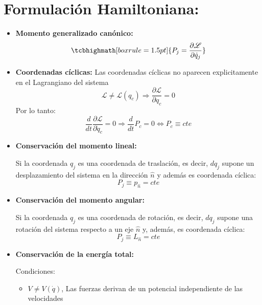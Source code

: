 \documentclass[14pt]{extarticle}
\newcommand{\Lagr}{\mathscr{L}}
\newcommand{\ddt}{\frac{d}{dt}}
\begin{document}
	\clearpage
	\section{Formulación Hamiltoniana:}

		\begin{itemize}
			\item{ \textbf{Momento generalizado canónico: }
			\begin{equation}
				\tcbhighmath[boxrule=1.5pt]{P_j = \frac{\partial \Lagr}{\partial \dot{q}_j}}
			\end{equation}
			}

			\item{ \textbf{Coordenadas cíclicas: }
			Las coordenadas cíclicas no aparecen explicitamente en el Lagrangiano del sistema
			\begin{equation}
				\Lagr \neq \Lagr(q_c) \Longrightarrow \frac{\partial \Lagr}{\partial q_c} = 0
			\end{equation}
			Por lo tanto:
			\begin{equation}
				\ddt \frac{\partial \Lagr}{\partial \dot{q}_c} = 0 \Rightarrow \ddt P_c = 0 \Longleftrightarrow P_c \equiv cte
			\end{equation}
			}
			\item{ \textbf{Conservación del momento lineal: }

			Si la coordenada $q_j$ es una coordenada de traslación, es decir, $dq_j$ supone un desplazamiento del sistema en la dirección $\hat{n}$ y además es coordenada cíclica:
			\begin{equation}
				P_j \equiv p_{\hat{n}} = cte
			\end{equation}
			}

			\item{ \textbf{Conservación del momento angular: }
			
			Si la coordenada $q_j$ es una coordenada de rotación, es decir, $dq_j$ supone una rotación del sistema respecto a un eje $\hat{n}$ y, además, es coordenada cíclica:
			\begin{equation}
				P_j \equiv L_{\hat{n}} = cte
			\end{equation}
			}

			\item{ \textbf{Conservación de la energía total: }

			Condiciones:
				\begin{itemize}
				\item $V \neq V(\dot{q})$, Las fuerzas derivan de un potencial independiente de las velocidades


\end{itemize}}
\end{itemize}
\end{document}
